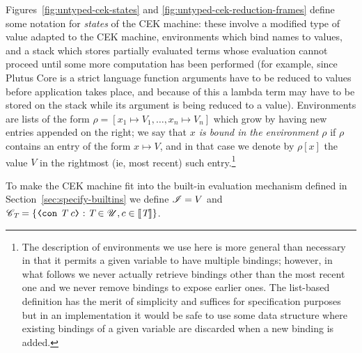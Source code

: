   

\noindent Figures~\ref{fig:untyped-cek-states} and \ref{fig:untyped-cek-reduction-frames}
define some notation for \textit{states} of the CEK machine: these involve a
modified type of value adapted to the CEK machine, environments which bind names
to values, and a stack which stores partially evaluated terms whose evaluation
cannot proceed until some more computation has been performed (for example,
since Plutus Core is a strict language function arguments have to be reduced to
values before application takes place, and because of this a lambda term may
have to be stored on the stack while its argument is being reduced to a value).
Environments are lists of the form $\rho = [x_1 \mapsto V_1, \ldots, x_n \mapsto
  V_n]$ which grow by having new entries appended on the right; we say that
\textit{$x$ is \textit{bound} in the environment $\rho$} if $\rho$ contains an
entry of the form $x \mapsto V$, and in that case we denote by $\rho[x]$ the
value $V$ in the rightmost (ie, most recent) such entry.\footnote{The
  description of environments we use here is more general than necessary in that
  it permits a given variable to have multiple bindings; however, in what
  follows we never actually retrieve bindings other than the most recent one and
  we never remove bindings to expose earlier ones.  The list-based definition
  has the merit of simplicity and suffices for specification purposes but in an
  implementation it would be safe to use some data structure where existing
  bindings of a given variable are discarded when a new binding is added.}

To make the CEK machine fit into the built-in evaluation mechanism defined in
Section~\ref{sec:specify-builtins} we define $\mathscr{I} = V$ and $\Con{\tn} =
\{\VCon{\tn}{c} : \tn \in \Uni, c \in \denote{\tn}\}$.

